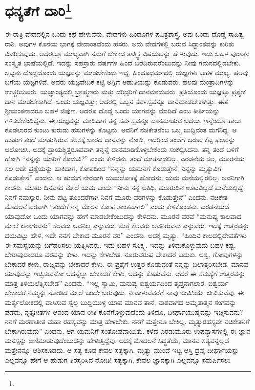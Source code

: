 
\chapter[ಧನ್ಯತೆಗೆ ದಾರಿ]{ಧನ್ಯತೆಗೆ ದಾರಿ\protect\footnote{}}

ಈ ರಾತ್ರಿ ವೇದದಲ್ಲಿನ ಒಂದು ಕಥೆ ಹೇಳುವೆನು. ವೇದಗಳು ಹಿಂದೂಗಳ ಪವಿತ್ರಶಾಸ್ತ್ರ. ಅವು ಒಂದು ದೊಡ್ಡ ಸಾಹಿತ್ಯ ರಾಶಿ. ಅವುಗಳ ಕೊನೆಯ ಭಾಗಕ್ಕೆ ವೇದಾಂತವೆಂದು ಹೆಸರು. ಅದು ವೇದಗಳಲ್ಲಿ ಬರುವ ಸಿದ್ದಾಂತವನ್ನು ಕುರಿತು ವಿವರಿಸುವುದು. ಅದರಲ್ಲೂ ಮುಖ್ಯವಾಗಿ ನಮಗೆ ಬೇಕಾದ ತಾತ್ತ್ವಿಕ ವಿಷಯವನ್ನು ಹೇಳುವುದು. ಇದು ಬಹಳ ಪುರಾತನ ಸಂಸ್ಕೃತ ಭಾಷೆಯಲ್ಲಿದೆ. ಇದನ್ನು ಸಹಸ್ರಾರು ವರ್ಷಗಳ ಹಿಂದೆ ಬರೆದಿರುವರೆಂಬುದನ್ನು ನೀವು ಗಮನದಲ್ಲಿಡಬೇಕು. ಒಬ್ಬನು ದೊಡ್ಡದೊಂದು ಯಜ್ಞವನ್ನು ಮಾಡಬೇಕೆಂದು ಇದ್ದ. ಹಿಂದೂಧರ್ಮದಲ್ಲಿ ಯಜ್ಞಗಳು ಬಹಳ ಮುಖ್ಯ. ಹಲವು ಬಗೆಯ ಯಜ್ಞಗಳಿವೆ. ಅವರು ಯಜ್ಞವೇದಿಕೆ ಕಟ್ಟಿ ಅಗ್ನಿಗೆ ಆಹುತಿಯನ್ನು ಕೊಡುವರು. ಹಲವು ಮಂತ್ರಾದಿಗಳನ್ನು ಉಚ್ಚರಿಸುವರು. ಯಜ್ಞಾಂತ್ಯದಲ್ಲಿ ಬ್ರಾಹ್ಮಣರು ಮತ್ತು ದರಿದ್ರರಿಗೆ ದಾನಮಾಡುವರು. ಪ್ರತಿಯೊಂದು ಯಜ್ಞಕ್ಕೂ ಪ್ರತ್ಯೇಕ ದಾನ ಮಾಡಬೇಕಾಗಿದೆ. ಒಂದು ಯಜ್ಞವಿತ್ತು; ಅದರಲ್ಲಿ ಒಬ್ಬನ ಸರ್ವಸ್ವವನ್ನೂ ದಾನಮಾಡಬೇಕಾಗಿತ್ತು. ಈತ ಶ‍್ರೀಮಂತನಾದರೂ ಬಹಳ ಜಿಪುಣ. ಆದರೂ ದೊಡ್ಡ ಒಂದು ಯಾಗವನ್ನು ಮಾಡಿದೆ ಎಂಬ ಕೀರ್ತಿಯನ್ನು ಗಳಿಸಬೇಕೆಂದಿದ್ದನು. ಈ ಯಜ್ಞವನ್ನು ಮಾಡಿದಾಗ ತನ್ನ ಸರ್ವಸ್ವವನ್ನೂ ದಾನಮಾಡುವ ಬದಲು, ಇನ್ನೆಂದೂ ಹಾಲು ಕೊಡಲಾರದ ಕುಂಟು ಕುರುಡು ಹಸುಗಳನ್ನು ಕೊಟ್ಟನು. ಅವನಿಗೆ ನಚಿಕೇತನೆಂಬ ಒಬ್ಬ ಬುದ್ದಿವಂತ ಮಗನಿದ್ದ. ಆ ಹುಡುಗ ತಂದೆ ಮಾಡುತ್ತಿರುವ ಕೆಲಸಕ್ಕೆ ಬಾರದ ದಾನವನ್ನು ನೋಡಿ, ಇದರಿಂದ ತಂದೆಗೆ ಬರುವ ಕೆಟ್ಟ ಫಲವನ್ನು ಆಲೋಚಿಸಿ, ಅದಕ್ಕೆ ಪ್ರಾಯಶ್ಚಿತ್ತರೂಪವಾಗಿ ತನ್ನನ್ನೆ ದಾನಮಾಡಿಕೊಳ್ಳಬೇಕೆಂದು ಸಂಕಲ್ಪಿಸಿದನು. ತನ್ನ ತಂದೆ ಬಳಿಗೆ ಹೋಗಿ “ನನ್ನನ್ನು ಯಾರಿಗೆ ಕೊಡುವಿ?'' ಎಂದು ಕೇಳಿದನು. ತಂದೆ ಮಾತನಾಡಲಿಲ್ಲ. ಎರಡನೆಯ ಸಲ, ಮೂರನೆಯ ಸಲ ಅದೇ ಪ್ರಶ್ನೆಯನ್ನು ಹಾಕಿದಾಗ, ಕೋಪದಿಂದ “ನಿನ್ನನ್ನು ಯಮನಿಗೆ ಕೊಡುತ್ತೇನೆ, ನಿನ್ನನ್ನು ಮೃತ್ಯುವಿಗೆ ಕೊಡುತ್ತೇನೆ'' ಎಂದನು. ಆ ಹುಡುಗ ನೇರವಾಗಿ ಯಮಲೋಕಕ್ಕೆ ಹೋದನು. ಯಮ ಮನೆಯಲ್ಲಿರಲಿಲ್ಲ. ಅವನಿಗಾಗಿ ಕಾದನು. ಮೂರು ದಿನವಾದ ಮೇಲೆ ಯಮ ಬಂದು “ನೀನು ನನ್ನ ಅತಿಥಿ, ಮೂರುದಿನ ಊಟವಿಲ್ಲದೆ ಮನೆಯಲ್ಲಿದ್ದೆ. ನಿನಗೆ ನಮಸ್ಕಾರ. ನೀನು ಪಟ್ಟ ತೊಂದರೆಗಾಗಿ ನಿನಗೆ ಮೂರು ವರಗಳನ್ನು ಕೊಡುತ್ತೇನೆ” ಎಂದನು. ನಚಿಕೇತ ಮೊದಲನೆ ವರವಾಗಿ “ತಂದೆಗೆ ನನ್ನ ಮೇಲಿನ ಕೋಪ ಶಾಂತವಾಗಲಿ'' ಎಂದು ಕೇಳಿಕೊಂಡನು. ಎರಡನೆಯದೆ ಯಾವುದೋ ಒಂದು ಯಾಗವನ್ನು ಹೇಗೆ ಮಾಡಬೇಕೆಂಬುದನ್ನು ಕೇಳಿದನು. ಮೂರನೆ ವರವೆ “ಮನುಷ್ಯ ಕಾಲವಾದ ಮೇಲೆ ಏನಾಗುವನು? ಕೆಲವರು ಅವನಿಲ್ಲ ಎನ್ನುವರು. ಮತ್ತೆ ಕೆಲವರು ಅವನಿರುವನು ಎನ್ನುವರು. ಇದಕ್ಕೆ ಉತ್ತರವನ್ನು ದಯವಿಟ್ಟು ಹೇಳಿ, ಇದೇ ನನಗೆ ಬೇಕಾದ ಮೂರನೆ ವರ'' ಎಂದನು. ಅದಕ್ಕೆ ಮೃತ್ಯು, “ಹಿಂದಿನ ಕಾಲದಲ್ಲಿ\break ದೇವತೆಗಳು ಈ ಸಮಸ್ಯೆಯನ್ನು ಬಗೆಹರಿಸಲು ಯತ್ನಿಸಿದರು. ಇದು ಬಹಳ ಸೂಕ್ಷ್ಮ. ಇದನ್ನು ತಿಳಿದುಕೊಳ್ಳುವುದು ಬಹಳ ಕಷ್ಟ. ಬೇರಾವುದಾದರೂ ವರವನ್ನು ಕೇಳು. ಇದನ್ನು ಕೇಳಬೇಡ. ನೂರುವರುಷ ಬೇಕಾದರೆ ಬದುಕು. ಅಶ್ವ, ಗೋವುಗಳನ್ನು ಬೇಕಾದರೆ ಕೇಳು, ರಾಜ್ಯವನ್ನು ಬೇಕಾದರೆ ಕೇಳು. ಈ ಪ್ರಶ್ನೆಗೆ ಉತ್ತರ ಕೊಡುವಂತೆ ನನ್ನನ್ನು ಬಲಾತ್ಕರಿಸಬೇಡ. ಮಾನವ ಯಾವುದನ್ನು ಇಚ್ಛಿಸುವನೋ ಅದನ್ನೆಲ್ಲಾ ಬೇಕಾದರೆ ಕೇಳು, ಅದನ್ನು ಕೊಡುವೆನು. ಆದರೆ ಈ ಸಮಸ್ಯೆಗೆ ಉತ್ತರವನ್ನು ಮಾತ್ರ ತಿಳಿಯಲೆತ್ನಿಸಬೇಡ'' ಎಂದನು. “ಇಲ್ಲ ಸ್ವಾಮಿ, ಮನುಷ್ಯ ಐಶ್ವರ್ಯದಿಂದ ತೃಪ್ತನಾಗಲಾರ. ಐಶ್ವರ್ಯ ಬೇಕಾದರೆ ನಿಮ್ಮನ್ನು ನೋಡಿದ ಮೇಲೆ ಬಂದೇ ಬರುವುದು. ನೀವಾಳುವವರೆಗೆ ನಾವು ಜೀವಿಸಿಯೇ ಜೀವಿಸುವೆವು, ಈ ಮರ್ತ್ಯಲೋಕದಲ್ಲಿ ವಾಸಿಸುವ ಸ್ವಲ್ಪ ಬುದ್ದಿಯುಳ್ಳ ಯಾವ ಮಾನವ ತಾನೆ, ನಾಶವಾಗದ ಅಮೃತಾತ್ಮನ ಸಂಗವನ್ನು ಪಡೆದು, ನೃತ್ಯಗೀತಗಳ ಆನಂದ ಯಾವ ರೀತಿ ಕೊನೆಗೊಳ್ಳುವುದೆಂದು ತಿಳಿದೂ, ದೀರ್ಘಾಯುಷ್ಯವನ್ನು ಇಚ್ಚಿಸುವನು? ನನಗೆ ಮರಣಾತೀತ ಮಹಾ ರಹಸ್ಯವನ್ನು ಮಾತ್ರ ಹೇಳಬೇಕು. ನನಗೆ ಮತ್ತೇನೂ ಬೇಕಿಲ್ಲ. ಮೃತ್ಯುರಹಸ್ಯವೇ ನಚಿಕೇತನಿಗೆ ಬೇಕಾಗಿರುವುದು” ಎಂದನು. ಆಗ ಯಮನಿಗೆ ಸಂತೋಷವಾಯಿತು. ಕಳೆದ ಎರಡುಮೂರು ಉಪನ್ಯಾಸಗಳಲ್ಲಿ ಈ ಜ್ಞಾನ ಮನಸ್ಸನ್ನು ಅಣಿಮಾಡುವುದೆಂಬುದನ್ನು ಹೇಳುತ್ತಿದ್ದೆವು. ಅದಕ್ಕೆ ಮೊದಲನೆ ಸಿದ್ಧತೆಯೆ, ಮಾನವ ಸತ್ಯವನ್ನಲ್ಲದೆ ಮತ್ತೇನನ್ನೂ ಆಶಿಸಕೂಡದು. ಆ ಸತ್ಯ ಕೂಡ ಕೇವಲ ಸತ್ಯಕ್ಕಾಗಿ. ಮೃತ್ಯು ಮುಂದೆ ಇಟ್ಟ ಆಸ್ತಿ ದ್ರವ್ಯ ದೀರ್ಘಾಯಸ್ಸು ಎಲ್ಲವನ್ನೂ ಹೇಗೆ ಆ ಹುಡುಗ ತಿರಸ್ಕರಿಸಿದ ನೋಡಿ! ಸತ್ಯಕ್ಕಾಗಿ, ಕೇವಲ ಜ್ಞಾನಕ್ಕಾಗಿ ಎಲ್ಲವನ್ನೂ ಸಮರ್ಪಿಸಲು 